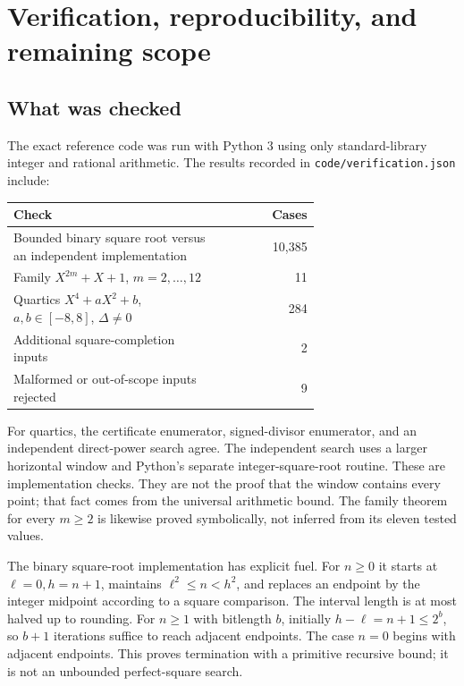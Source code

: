 \section{Verification, reproducibility, and remaining scope}
\label{sec:verification}

\subsection{What was checked}

The exact reference code was run with Python 3 using only standard-library
integer and rational arithmetic. The results recorded in
\texttt{code/verification.json} include:
\begin{center}
\begin{tabular}{@{}p{0.68\linewidth}r@{}}
\toprule
Check & Cases\\
\midrule
Bounded binary square root versus an independent implementation & 10,385\\
Family $X^{2m}+X+1$, $m=2,\ldots,12$ & 11\\
Quartics $X^4+aX^2+b$, $a,b\in[-8,8]$, $\Delta\ne0$ & 284\\
Additional square-completion inputs & 2\\
Malformed or out-of-scope inputs rejected & 9\\
\bottomrule
\end{tabular}
\end{center}

For quartics, the certificate enumerator, signed-divisor enumerator,
and an independent direct-power search agree. The independent search
uses a larger horizontal window and Python's separate integer-square-root
routine. These are implementation checks. They are not the proof
that the window contains every point; that fact comes from the
universal arithmetic bound. The family theorem for every $m\ge2$ is
likewise proved symbolically, not inferred from its eleven tested values.

The binary square-root implementation has explicit fuel. For $n\ge0$
it starts at $\ell=0,h=n+1$, maintains
$\ell^2\le n<h^2$, and replaces an endpoint by the integer midpoint
according to a square comparison. The interval length is at most
halved up to rounding. For $n\ge1$ with bitlength $b$, initially
$h-\ell=n+1\le2^b$, so $b+1$ iterations suffice to reach adjacent
endpoints. The case $n=0$ begins with adjacent endpoints. This proves
termination with a primitive recursive bound; it is not an
unbounded perfect-square search.

